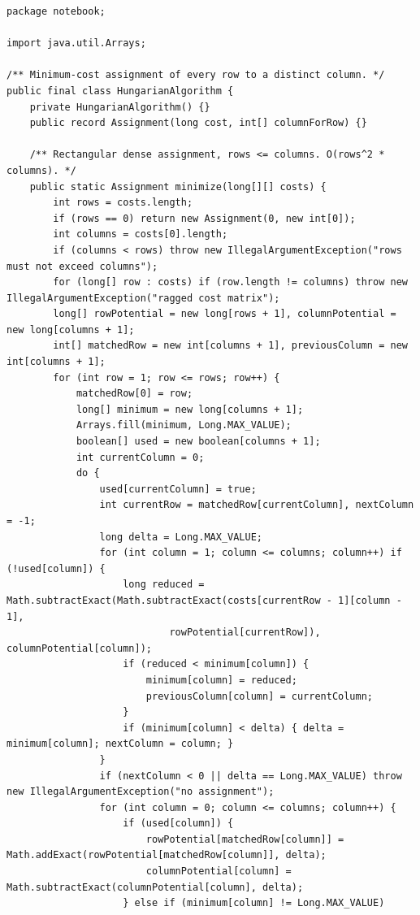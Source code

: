 \documentclass[10pt,letterpaper]{article}
\begin{document}
\begin{lstlisting}
package notebook;

import java.util.Arrays;

/** Minimum-cost assignment of every row to a distinct column. */
public final class HungarianAlgorithm {
    private HungarianAlgorithm() {}
    public record Assignment(long cost, int[] columnForRow) {}

    /** Rectangular dense assignment, rows <= columns. O(rows^2 * columns). */
    public static Assignment minimize(long[][] costs) {
        int rows = costs.length;
        if (rows == 0) return new Assignment(0, new int[0]);
        int columns = costs[0].length;
        if (columns < rows) throw new IllegalArgumentException("rows must not exceed columns");
        for (long[] row : costs) if (row.length != columns) throw new IllegalArgumentException("ragged cost matrix");
        long[] rowPotential = new long[rows + 1], columnPotential = new long[columns + 1];
        int[] matchedRow = new int[columns + 1], previousColumn = new int[columns + 1];
        for (int row = 1; row <= rows; row++) {
            matchedRow[0] = row;
            long[] minimum = new long[columns + 1];
            Arrays.fill(minimum, Long.MAX_VALUE);
            boolean[] used = new boolean[columns + 1];
            int currentColumn = 0;
            do {
                used[currentColumn] = true;
                int currentRow = matchedRow[currentColumn], nextColumn = -1;
                long delta = Long.MAX_VALUE;
                for (int column = 1; column <= columns; column++) if (!used[column]) {
                    long reduced = Math.subtractExact(Math.subtractExact(costs[currentRow - 1][column - 1],
                            rowPotential[currentRow]), columnPotential[column]);
                    if (reduced < minimum[column]) {
                        minimum[column] = reduced;
                        previousColumn[column] = currentColumn;
                    }
                    if (minimum[column] < delta) { delta = minimum[column]; nextColumn = column; }
                }
                if (nextColumn < 0 || delta == Long.MAX_VALUE) throw new IllegalArgumentException("no assignment");
                for (int column = 0; column <= columns; column++) {
                    if (used[column]) {
                        rowPotential[matchedRow[column]] = Math.addExact(rowPotential[matchedRow[column]], delta);
                        columnPotential[column] = Math.subtractExact(columnPotential[column], delta);
                    } else if (minimum[column] != Long.MAX_VALUE)

\end{lstlisting}
\end{document}

